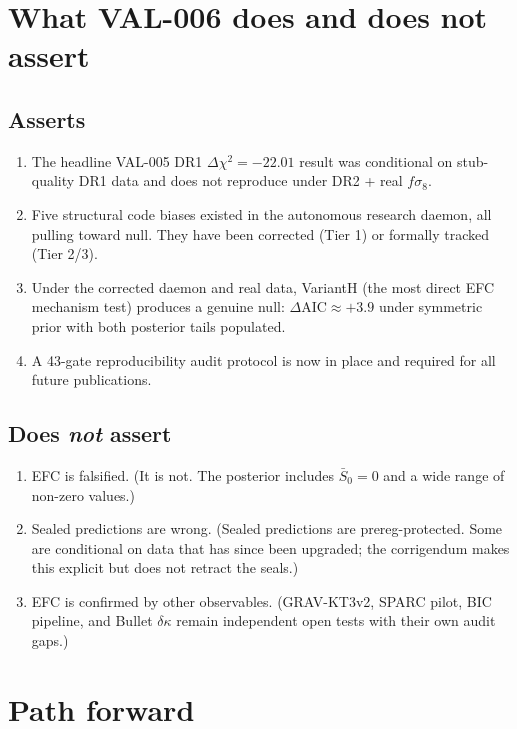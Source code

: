 \documentclass[11pt]{article}
\begin{document}
\section{What VAL-006 does and does not assert}

\subsection{Asserts}
\begin{enumerate}[leftmargin=*]
\item The headline VAL-005 DR1 $\Delta\chi^2 = -22.01$ result was
conditional on stub-quality DR1 data and does not reproduce under DR2 +
real $f\sigma_8$.
\item Five structural code biases existed in the autonomous research
daemon, all pulling toward null. They have been corrected (Tier 1) or
formally tracked (Tier 2/3).
\item Under the corrected daemon and real data, VariantH (the most direct
EFC mechanism test) produces a genuine null: $\Delta\text{AIC}\approx+3.9$
under symmetric prior with both posterior tails populated.
\item A 43-gate reproducibility audit protocol is now in place and
required for all future publications.
\end{enumerate}

\subsection{Does \emph{not} assert}
\begin{enumerate}[leftmargin=*]
\item EFC is falsified. (It is not. The posterior includes $\bar{S}_0=0$
and a wide range of non-zero values.)
\item Sealed predictions are wrong. (Sealed predictions are
prereg-protected. Some are conditional on data that has since been
upgraded; the corrigendum makes this explicit but does not retract the
seals.)
\item EFC is confirmed by other observables. (GRAV-KT3v2, SPARC pilot,
BIC pipeline, and Bullet $\delta\kappa$ remain independent open tests
with their own audit gaps.)
\end{enumerate}

\section{Path forward}
\end{document}
